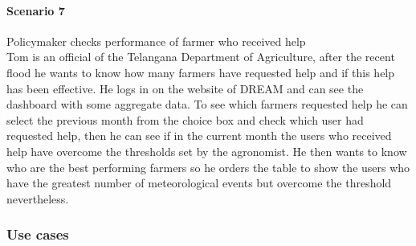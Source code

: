 \bigskip
\paragraph{Scenario 7} Policymaker checks performance of farmer who received help\\
Tom is an official of the Telangana Department of Agriculture, after the recent flood he wants to know how many farmers have requested 
help and if this help has been effective. He logs in on the website of DREAM and can see the dashboard with some aggregate data. 
To see which farmers requested help he can select the previous month from the choice box and check which user had requested help, 
then he can see if in the current month the users who received help have overcome the thresholds set by the agronomist. He then wants 
to know who are the best performing farmers so he orders the table to show the users who have the greatest number of meteorological 
events but overcome the threshold nevertheless.

\subsubsection{Use cases}

